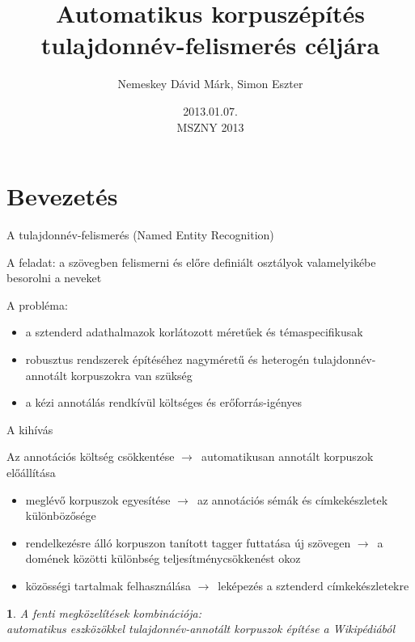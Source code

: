 \documentclass[utf8x,t]{beamer}
\title %
{Automatikus korpuszépítés tulajdonnév-felismerés céljára}
\author %
{Nemeskey Dávid Márk\inst{1}, Simon Eszter\inst{2}}
\institute{\inst{1} MTA SZTAKI \\
\inst{2} MTA Nyelvtudományi Intézet} %
\date %
{2013.01.07. \\ MSZNY 2013}
\newcommand{\nyil}{$\rightarrow$\ }
\newtheorem{nix}{}[section]
\begin{document}
\begin{frame}{}
  \titlepage
\end{frame}

\section{Bevezetés}

\begin{frame}{A tulajdonnév-felismerés (Named Entity Recognition)}

\bigskip

A feladat: a szövegben felismerni és előre definiált osztályok valamelyikébe besorolni a neveket 

\bigskip

A probléma:
\begin{itemize}
\item a sztenderd adathalmazok korlátozott méretűek és témaspecifikusak 
\item robusztus rendszerek építéséhez nagyméretű és heterogén tulajdonnév-annotált korpuszokra van szükség
\item a kézi annotálás rendkívül költséges és erőforrás-igényes
\end{itemize}

\end{frame}

\begin{frame}{A kihívás}

Az annotációs költség csökkentése \nyil automatikusan annotált korpuszok előállítása

\begin{itemize}
\item meglévő korpuszok egyesítése \nyil az annotációs sémák és címkekészletek különbözősége 
\item rendelkezésre álló korpuszon tanított tagger futtatása új szövegen \nyil a domének közötti különbség teljesítménycsökkenést okoz
\item közösségi tartalmak felhasználása \nyil leképezés a sztenderd címkekészletekre
\end{itemize}

\smallskip

\begin{nix}
A fenti megközelítések kombinációja: \\ automatikus eszközökkel tulajdonnév-annotált korpuszok építése a Wikipédiából
\end{nix}

\end{frame}
\end{document}
